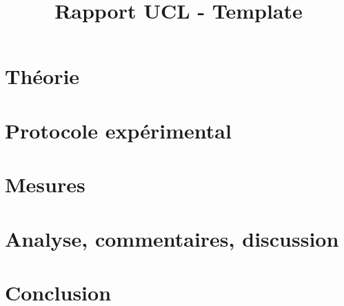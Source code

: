 \documentclass{rapport}
\title{Rapport UCL - Template} %
\begin{document}





        
\fairemarges %
\fairepagedegarde %
\tabledematieres %



\section{Théorie}


\section{Protocole expérimental}


\section{Mesures}


\section{Analyse, commentaires, discussion}


\section{Conclusion}


\end{document}
